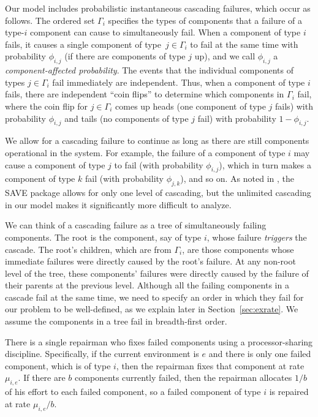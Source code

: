 \documentclass[12pt]{article}
\newcommand{\changed}[1]{#1}
\newcommand{\changed}[1]{\textcolor{red}{#1}}
\begin{document}
Our model includes probabilistic instantaneous cascading failures, which occur as follows. The ordered set $\Gamma_i$ specifies the types of components that a failure of a type-$i$ component can cause to simultaneously fail. When a component of type $i$ fails, it causes a single  component of type~$j \in \Gamma_i$ to fail at the same time with probability $\phi_{i, j}$ (if there are components of type $j$ up), and we call $\phi_{i, j}$  a \textit{component-affected probability}. The events that the individual components of types $j \in \Gamma_i$ fail immediately are independent. Thus, when a component of type $i$ fails, there are independent ``coin flips'' to determine which components in $\Gamma_i$ fail, where the coin flip for $j \in \Gamma_i$ comes up heads (one component of type $j$ fails) with probability $\phi_{i, j}$ and tails (no components of type $j$ fail) with probability $1 - \phi_{i, j}$.

We allow for a cascading failure to continue as long as there are still components operational in the system.  For example, the failure of a component of type $i$ may cause a component of type $j$ to fail (with probability $\phi_{i, j}$), which in turn makes a component of type $k$ fail (with probability $\phi_{j, k}$), and so on. As noted in \cite{ING:2009}, the SAVE package \cite{BHLNS:1994} allows for only one level of cascading, but the unlimited cascading in our model makes it significantly more difficult to analyze.

We can think of a cascading failure as a tree of simultaneously failing components. The root is the component, say of type $i$, whose failure \textit{triggers} the cascade. The root's children, which are from $\Gamma_i$, are those components whose immediate failures were directly caused by the root's failure. At any non-root level of the tree,  these components' failures were directly caused by the failure of their parents at the previous level. Although all the failing components in a cascade fail at the same time, we need to specify an order in which they fail for our problem to be well-defined, as we explain later
\changed{in Section~\ref{sec:exrate}}. We assume the components in a tree fail in breadth-first order.

There is a single repairman who fixes failed components using a processor-sharing discipline. Specifically, if the current environment is $e$ and there is only one failed component, which is of type $i$, then the repairman fixes that component at rate $\mu_{i, e}$. If there are $b$ components currently failed, then the repairman allocates $1 / b$ of his effort to each failed component, so a failed component of type $i$ is repaired at rate $\mu_{i, e}/b$.
\end{document}
